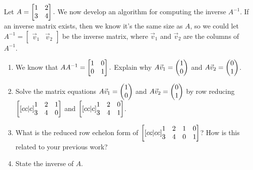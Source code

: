\begin{problem}
Let 
$A=
\begin{bmatrix}
\begin{matrix} 1\\3 \end{matrix}&
\begin{matrix} 2\\4 \end{matrix}
\end{bmatrix}
.$
We now develop an algorithm for computing the inverse $A^{-1}$.
If an inverse matrix exists, then we know it's the same size as $A$, so we could let $A^{-1}=\begin{bmatrix}\vec v_1 & \vec v_2\end{bmatrix}$ be the inverse matrix, where $\vec v_1$ and $\vec v_2$ are the columns of $A^{-1}$.  
\begin{enumerate}
 \item  We know that $A A^{-1} = \begin{bmatrix}\begin{matrix} 1\\0 \end{matrix}&\begin{matrix} 0\\1 \end{matrix}\end{bmatrix}.$ 
Explain why $A\vec v_1=\begin{pmatrix} 1\\0 \end{pmatrix}$ and $A\vec v_2=\begin{pmatrix} 0\\1 \end{pmatrix}$.
 \item Solve the matrix equations $A\vec v_1=\begin{pmatrix} 1\\0 \end{pmatrix}$ and $A\vec v_2=\begin{pmatrix} 0\\1 \end{pmatrix}$ by row reducing 
$
\begin{bmatrix}[cc|c]
\begin{matrix} 1\\3 \end{matrix}&
\begin{matrix} 2\\4 \end{matrix}&
\begin{matrix} 1\\0 \end{matrix}
\end{bmatrix}
$
and 
$
\begin{bmatrix}[cc|c]
\begin{matrix} 1\\3 \end{matrix}&
\begin{matrix} 2\\4 \end{matrix}&
\begin{matrix} 0\\1 \end{matrix}
\end{bmatrix}
$.
 \item What is the reduced row echelon form of
$
\begin{bmatrix}[cc|cc]
\begin{matrix} 1\\3 \end{matrix}&
\begin{matrix} 2\\4 \end{matrix}&
\begin{matrix} 1\\0 \end{matrix}&
\begin{matrix} 0\\1 \end{matrix}
\end{bmatrix}
$? How is this related to your previous work?
 \item State the inverse of $A$. 
\end{enumerate}

\end{problem}

